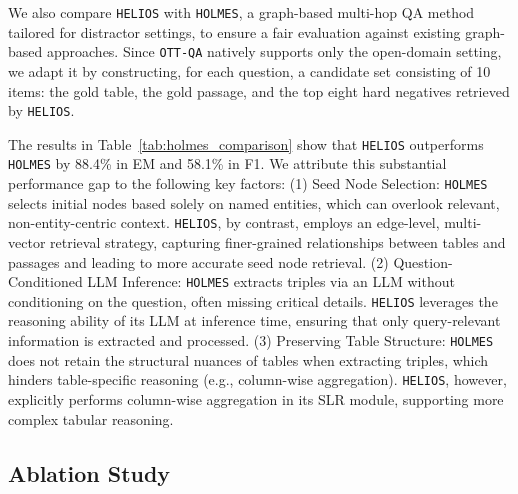 {
\feditcolor
We also compare \texttt{HELIOS} with \texttt{HOLMES}, a graph-based multi-hop QA method tailored for distractor settings, to ensure a fair evaluation against existing graph-based approaches.
Since \texttt{OTT-QA} natively supports only the open-domain setting, we adapt it by constructing, for each question, a candidate set consisting of 10 items: the gold table, the gold passage, and the top eight hard negatives retrieved by \texttt{HELIOS}.

The results in Table~\ref{tab:holmes_comparison} show that \texttt{HELIOS} outperforms \texttt{HOLMES} by 88.4\% in EM and 58.1\% in F1.
We attribute this substantial performance gap to the following key factors:
(1) Seed Node Selection: \texttt{HOLMES} selects initial nodes based solely on named entities, which can overlook relevant, non-entity-centric context. 
\texttt{HELIOS}, by contrast, employs an edge-level, multi-vector retrieval strategy, capturing finer-grained relationships between tables and passages and leading to more accurate seed node retrieval.
(2) Question-Conditioned LLM Inference: \texttt{HOLMES} extracts triples via an LLM without conditioning on the question, often missing critical details. 
\texttt{HELIOS} leverages the reasoning ability of its LLM at inference time, ensuring that only query-relevant information is extracted and processed.
(3) Preserving Table Structure: \texttt{HOLMES} does not retain the structural nuances of tables when extracting triples, which hinders table-specific reasoning (e.g., column-wise aggregation). 
\texttt{HELIOS}, however, explicitly performs column-wise aggregation in its SLR module, supporting more complex tabular reasoning.
}

































\vspace{-1mm}
\subsection{Ablation Study}
\label{sec:exp_ablation_study}
\vspace{-1mm}

